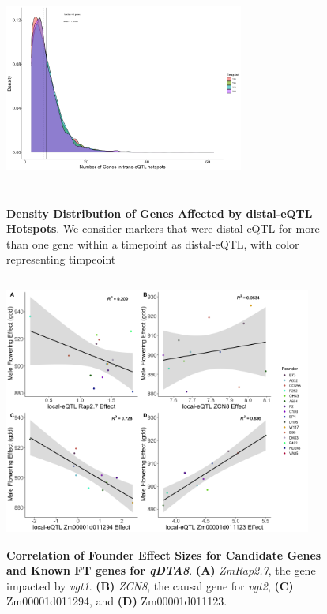 \documentclass[article,9pt,twocolumn,twoside]{rilabRxiv}
\begin{document}
\begin{figure}[!ht]
\centering
\includegraphics[width=0.7\textwidth,height=3in]{figures/trans_eQTL_hotpsots.png}
\caption{\textbf{Density Distribution of Genes Affected by distal-eQTL Hotspots}. We consider markers that were distal-eQTL for more than one gene within a timepoint as distal-eQTL, with color representing timpeoint}
\label{fig:chapter2_supfigure1}
\end{figure}

\begin{figure}[!ht]
\centering
\includegraphics[width=0.9\textwidth,height=3.5in]{figures/chapter2_figure5.png}
\caption{\textbf{Correlation of Founder Effect Sizes for Candidate Genes and Known FT genes for \textit{qDTA8}}. \textbf{(A)} \textit{ZmRap2.7}, the gene impacted by \textit{vgt1}. 
\textbf{(B)} \textit{ZCN8}, the causal gene for \textit{vgt2},
\textbf{(C)} Zm00001d011294, and \textbf{(D)} Zm00001d011123.}
\label{fig:chapter2_supfigure4}
\end{figure}
\end{document}
